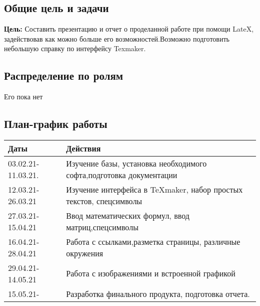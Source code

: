 \documentclass[12pt, a4paper]{article}
\begin{document}
\subsection{Общие цель и задачи}
\textbf{Цель:} Составить презентацию и отчет о проделанной работе при помощи LateX, задействовав как можно больше его возможностей.Возможно подготовить небольшую справку по интерфейсу Texmaker.
\subsection{Распределение по ролям}
Его пока нет
\subsection{План-график работы}
\begin{tabular}{| l| l|}
\hline {\bfseries \large Даты} & {\bfseries \large Действия}\\ \hline
03.02.21-11.03.21. & Изучение базы, установка необходимого софта,подготовка документации\\ \hline
12.03.21-26.03.21 & Изучение интерфейса в \TeX maker, набор простых текстов, спецсимволы \\ \hline
27.03.21-15.04.21 & Ввод математических формул, ввод матриц,спецсимволы  \\ \hline
16.04.21-28.04.21 & Работа с ссылками,разметка страницы, различные окружения \\ \hline
29.04.21-14.05.21 & Работа с изображениями и встроенной графикой \\ \hline
15.05.21- & Разработка финального продукта, подготовка отчета. \\ \hline
\end{tabular}
\section{}
\end{document}
